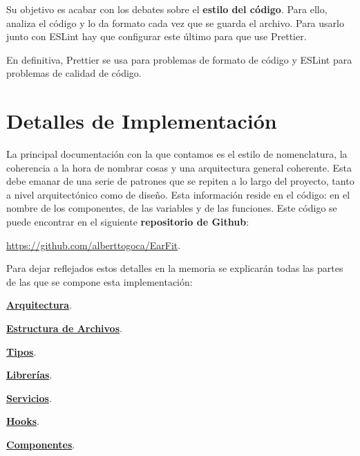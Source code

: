 \documentclass[12pt,twoside,titlepage]{report}
\begin{document}
Su objetivo es acabar con los debates sobre el \textbf{estilo del código}. Para ello, analiza el código y lo da formato cada vez que se guarda el archivo. Para usarlo junto con ESLint hay que configurar este último para que use Prettier.

En definitiva, Prettier se usa para problemas de formato de código y ESLint para problemas de calidad de código.

\section{Detalles de Implementación}
\label{sec:implementacion}

La principal documentación con la que contamos es el estilo de nomenclatura, la coherencia a la hora de nombrar cosas y una arquitectura general coherente. Esta debe emanar de una serie de patrones que se repiten a lo largo del proyecto, tanto a nivel arquitectónico como de diseño. Esta información reside en el código: en el nombre de los componentes, de las variables y de las funciones. Este código se puede encontrar en el siguiente \textbf{repositorio de Github}: 

\url{https://github.com/alberttogoca/EarFit}.

Para dejar reflejados estos detalles en la memoria se explicarán todas las partes de las que se compone esta implementación:
\begin{compactitem} 
\item \hyperref[sec:arquitectura]{\textbf{Arquitectura}}. 
\item \hyperref[sec:archivos]{\textbf{Estructura de Archivos}}.
\item \hyperref[sec:tipos]{\textbf{Tipos}}.
\item \hyperref[sec:lib]{\textbf{Librerías}}.
\item \hyperref[sec:servicios]{\textbf{Servicios}}.
\item \hyperref[sec:Hooks]{\textbf{Hooks}}.
\item \hyperref[sec:componentes]{\textbf{Componentes}}.
\end{compactitem} 
\end{document}
